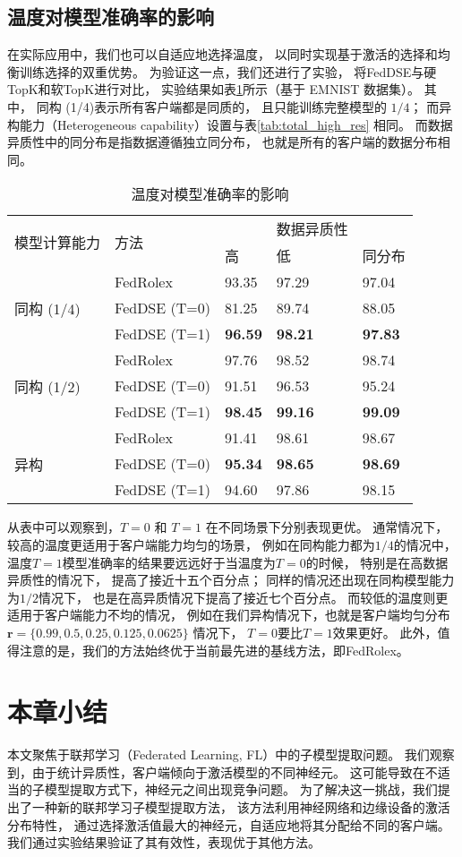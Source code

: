 \subsection{温度对模型准确率的影响}
在实际应用中，我们也可以自适应地选择温度，
以同时实现基于激活的选择和均衡训练选择的双重优势。
为验证这一点，我们还进行了实验，
将FedDSE与硬TopK和软TopK进行对比，
实验结果如表\ref{tab:effect_T}所示（基于 EMNIST 数据集）。
其中，
同构 (1/4)表示所有客户端都是同质的，
且只能训练完整模型的 $1/4$；
而异构能力（Heterogeneous capability）设置与表\ref{tab:total_high_res}
相同。
而数据异质性中的同分布是指数据遵循独立同分布，
也就是所有的客户端的数据分布相同。
\begin{table}[thbp]
    \caption{\label{tab:effect_T}温度对模型准确率的影响}
    \begin{tabularx}{\linewidth}{l l X<{\centering} X<{\centering} X<{\centering} }
        \toprule
        \multirow{2}{*}{模型计算能力} & \multirow{2}{*}{方法} & & 数据异质性 & \\
        \cline{3-5}
        & & 高 & 低 & 同分布 \\
        \midrule
        \multirow{3}{*}{同构 (1/4)} 
        & FedRolex & 93.35 & 97.29 & 97.04 \\
        & FedDSE (T=0) & 81.25 & 89.74 & 88.05\\
        & FedDSE (T=1) & \textbf{96.59} & \textbf{98.21} & \textbf{97.83} \\
        \midrule
        \multirow{3}{*}{同构 (1/2)}
        & FedRolex & 97.76 & 98.52 & 98.74 \\
        & FedDSE (T=0) & 91.51 & 96.53 & 95.24\\
        & FedDSE (T=1) & \textbf{98.45} & \textbf{99.16} & \textbf{99.09} \\
        \midrule
        \multirow{3}{*}{异构}
        &FedRolex & 91.41 & 98.61 & 98.67 \\
        &FedDSE (T=0) & \textbf{95.34} & \textbf{98.65} & \textbf{98.69}\\
        &FedDSE (T=1) & 94.60 & 97.86 & 98.15 \\
        \bottomrule
    \end{tabularx}
\end{table}

从表中可以观察到，$T=0$ 和 $T=1$ 在不同场景下分别表现更优。
通常情况下，较高的温度更适用于客户端能力均匀的场景，
例如在同构能力都为$1/4$的情况中，
温度$T=1$模型准确率的结果要远远好于当温度为$T=0$的时候，
特别是在高数据异质性的情况下，
提高了接近十五个百分点；
同样的情况还出现在同构模型能力为$1/2$情况下，
也是在高异质情况下提高了接近七个百分点。
而较低的温度则更适用于客户端能力不均的情况，
例如在我们异构情况下，也就是客户端均匀分布
$\mathbf{r} = \{ 0.99, 0.5, 0.25, 0.125, 0.0625 \}$
情况下，
$T=0$要比$T=1$效果更好。
此外，值得注意的是，我们的方法始终优于当前最先进的基线方法，即FedRolex。

\section{本章小结}
本文聚焦于联邦学习（Federated Learning, FL）中的子模型提取问题。
我们观察到，由于统计异质性，客户端倾向于激活模型的不同神经元。
这可能导致在不适当的子模型提取方式下，神经元之间出现竞争问题。
为了解决这一挑战，我们提出了一种新的联邦学习子模型提取方法，
该方法利用神经网络和边缘设备的激活分布特性，
通过选择激活值最大的神经元，自适应地将其分配给不同的客户端。
我们通过实验结果验证了其有效性，表现优于其他方法。
